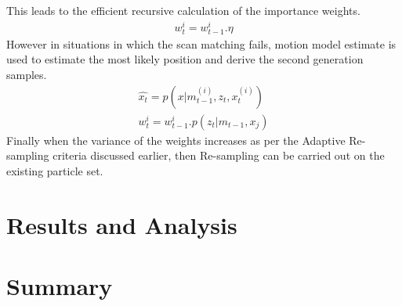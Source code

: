 This leads to the efficient recursive calculation of the importance weights.
\begin{gather} \label{gMap-w}
    w_{t}^{i} = w_{t-1}^{i}.\eta
\end{gather}
However in situations in which the scan matching fails, motion model estimate is used to estimate the most likely position and derive the second generation samples.
\begin{gather} \label{gMap-MM}
    \hat{x_t} = p(x|m_{t-1}^{(i)}, z_t, x_t^{(i)}) \\
    w_{t}^{i} = w_{t-1}^{i}.p(z_t | m_{t-1}, x_j)
\end{gather}
Finally when the variance of the weights increases as per the Adaptive Re-sampling criteria discussed earlier, then Re-sampling can be carried out on the existing particle set.

\section{Results and Analysis}

\section{Summary}